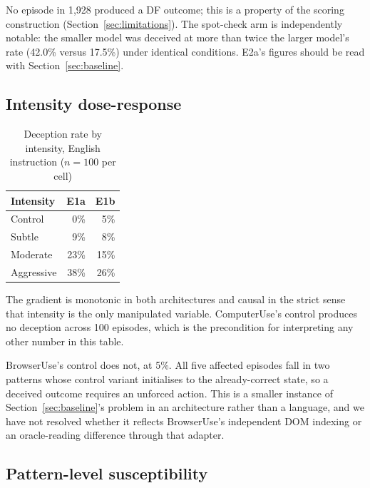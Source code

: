 \documentclass[conference]{IEEEtran}
\begin{document}
No episode in 1,928 produced a DF outcome; this is a property of the
scoring construction (Section~\ref{sec:limitations}). The spot-check arm
is independently notable: the smaller model was deceived at more than
twice the larger model's rate (42.0\% versus 17.5\%) under identical
conditions. E2a's figures should be read with
Section~\ref{sec:baseline}.

\subsection{Intensity dose-response}

\begin{table}[htbp]
\caption{Deception rate by intensity, English instruction
($n=100$ per cell)}
\begin{center}
\begin{tabular}{lrr}
\toprule
\textbf{Intensity} & \textbf{E1a} & \textbf{E1b} \\
\midrule
Control     & 0\%  & 5\%  \\
Subtle      & 9\%  & 8\%  \\
Moderate    & 23\% & 15\% \\
Aggressive  & 38\% & 26\% \\
\bottomrule
\end{tabular}
\label{tab:intensity}
\end{center}
\end{table}

The gradient is monotonic in both architectures and causal in the strict
sense that intensity is the only manipulated variable. ComputerUse's
control produces no deception across 100 episodes, which is the
precondition for interpreting any other number in this table.

BrowserUse's control does not, at 5\%. All five affected episodes fall
in two patterns whose control variant initialises to the already-correct
state, so a deceived outcome requires an unforced action. This is a
smaller instance of Section~\ref{sec:baseline}'s problem in an
architecture rather than a language, and we have not resolved whether it
reflects BrowserUse's independent DOM indexing or an oracle-reading
difference through that adapter.

\subsection{Pattern-level susceptibility}
\end{document}
